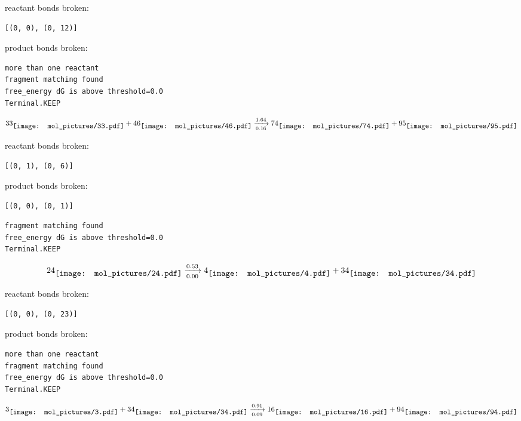 \documentclass{article}
\begin{document}
reactant bonds broken:\begin{verbatim}
[(0, 0), (0, 12)]
\end{verbatim}
product bonds broken:



\vspace{1cm}
\begin{verbatim}
more than one reactant
fragment matching found
free_energy dG is above threshold=0.0
Terminal.KEEP
\end{verbatim}
$$
33
\raisebox{-.5\height}{\texttt{[image: mol\_pictures/33.pdf]}}
+
46
\raisebox{-.5\height}{\texttt{[image: mol\_pictures/46.pdf]}}
\xrightarrow[0.16]{1.64}
74
\raisebox{-.5\height}{\texttt{[image: mol\_pictures/74.pdf]}}
+
95
\raisebox{-.5\height}{\texttt{[image: mol\_pictures/95.pdf]}}
$$


reactant bonds broken:\begin{verbatim}
[(0, 1), (0, 6)]
\end{verbatim}
product bonds broken:\begin{verbatim}
[(0, 0), (0, 1)]
\end{verbatim}




\vspace{1cm}
\begin{verbatim}
fragment matching found
free_energy dG is above threshold=0.0
Terminal.KEEP
\end{verbatim}
$$
24
\raisebox{-.5\height}{\texttt{[image: mol\_pictures/24.pdf]}}
\xrightarrow[0.00]{0.53}
4
\raisebox{-.5\height}{\texttt{[image: mol\_pictures/4.pdf]}}
+
34
\raisebox{-.5\height}{\texttt{[image: mol\_pictures/34.pdf]}}
$$


reactant bonds broken:\begin{verbatim}
[(0, 0), (0, 23)]
\end{verbatim}
product bonds broken:



\vspace{1cm}
\begin{verbatim}
more than one reactant
fragment matching found
free_energy dG is above threshold=0.0
Terminal.KEEP
\end{verbatim}
$$
3
\raisebox{-.5\height}{\texttt{[image: mol\_pictures/3.pdf]}}
+
34
\raisebox{-.5\height}{\texttt{[image: mol\_pictures/34.pdf]}}
\xrightarrow[0.09]{0.91}
16
\raisebox{-.5\height}{\texttt{[image: mol\_pictures/16.pdf]}}
+
94
\raisebox{-.5\height}{\texttt{[image: mol\_pictures/94.pdf]}}
$$
\end{document}

